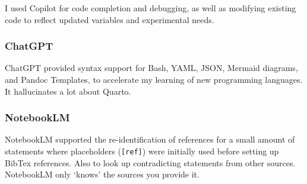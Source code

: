 \documentclass[
  11pt,
  a4paper,
]{scrbook}
\begin{document}
I used Copilot for code completion and debugging, as well as modifying
existing code to reflect updated variables and experimental needs.

\subsubsection*{ChatGPT}\label{chatgpt}

ChatGPT provided syntax support for Bash, YAML, JSON, Mermaid diagrams,
and Pandoc Templates, to accelerate my learning of new programming
languages. It hallucinates a lot about Quarto.

\subsubsection*{NotebookLM}\label{notebooklm}

NotebookLM supported the re-identification of references for a small
amount of statements where placeholders (\texttt{{[}ref{]}}) were
initially used before setting up BibTex references. Also to look up
contradicting statements from other sources. NotebookLM only `knows' the
sources you provide it.


\backmatter
\end{document}

